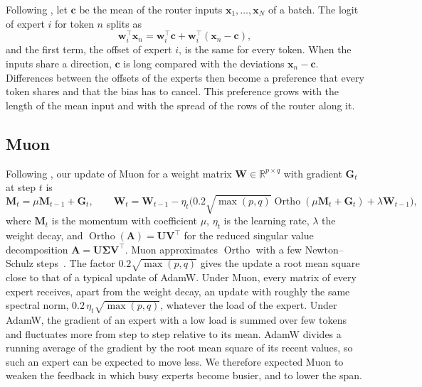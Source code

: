 \documentclass[11pt, a4paper]{article}
\newcommand{\vx}{\mathbf{x}}
\newcommand{\vc}{\mathbf{c}}
\newcommand{\vw}{\mathbf{w}}
\newcommand{\R}{\mathbb{R}}
\begin{document}
Following \citet{wang2026myth}, let $\vc$ be the mean of the router inputs $\vx_1, \dots, \vx_N$ of a batch. The logit of expert $i$ for token $n$ splits as
\begin{equation}
  \vw_i^{\top} \vx_n = \vw_i^{\top} \vc + \vw_i^{\top} (\vx_n - \vc),
  \label{eq:offset}
\end{equation}
and the first term, the offset of expert $i$, is the same for every token. When the inputs share a direction, $\vc$ is long compared with the deviations $\vx_n - \vc$. Differences between the offsets of the experts then become a preference that every token shares and that the bias has to cancel. This preference grows with the length of the mean input and with the spread of the rows of the router along it.

\subsection{Muon}
\label{sec:muon}

Following \citet{liu2025moonlight}, our update of Muon for a weight matrix $\mathbf{W} \in \R^{p \times q}$ with gradient $\mathbf{G}_t$ at step $t$ is
\begin{equation}
  \mathbf{M}_t = \mu \mathbf{M}_{t-1} + \mathbf{G}_t, \qquad
  \mathbf{W}_t = \mathbf{W}_{t-1} - \eta_t \bigl( 0.2 \sqrt{\max(p, q)} \operatorname{Ortho}(\mu \mathbf{M}_t + \mathbf{G}_t) + \lambda \mathbf{W}_{t-1} \bigr),
  \label{eq:muon}
\end{equation}
where $\mathbf{M}_t$ is the momentum with coefficient $\mu$, $\eta_t$ is the learning rate, $\lambda$ the weight decay, and $\operatorname{Ortho}(\mathbf{A}) = \mathbf{U} \mathbf{V}^{\top}$ for the reduced singular value decomposition $\mathbf{A} = \mathbf{U} \mathbf{\Sigma} \mathbf{V}^{\top}$. Muon approximates $\operatorname{Ortho}$ with a few Newton--Schulz steps~\citep{jordan2024muon}. The factor $0.2 \sqrt{\max(p, q)}$ gives the update a root mean square close to that of a typical update of AdamW\@. Under Muon, every matrix of every expert receives, apart from the weight decay, an update with roughly the same spectral norm, $0.2\, \eta_t \sqrt{\max(p, q)}$, whatever the load of the expert. Under AdamW, the gradient of an expert with a low load is summed over few tokens and fluctuates more from step to step relative to its mean. AdamW divides a running average of the gradient by the root mean square of its recent values, so such an expert can be expected to move less. We therefore expected Muon to weaken the feedback in which busy experts become busier, and to lower the span.
\end{document}

